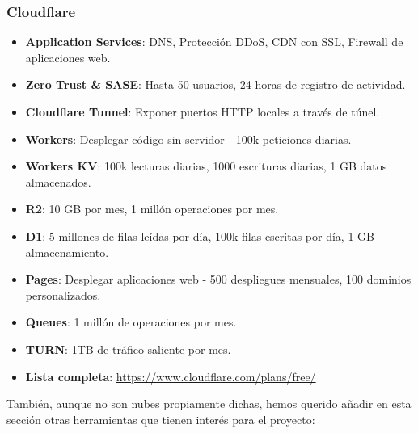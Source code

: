 \subsubsection*{Cloudflare}
\begin{itemize}
	\item \textbf{Application Services}: DNS, Protección DDoS, CDN con SSL, Firewall de aplicaciones web.
	\item \textbf{Zero Trust \& SASE}: Hasta 50 usuarios, 24 horas de registro de actividad.
	\item \textbf{Cloudflare Tunnel}: Exponer puertos HTTP locales a través de túnel.
	\item \textbf{Workers}: Desplegar código sin servidor - 100k peticiones diarias.
	\item \textbf{Workers KV}: 100k lecturas diarias, 1000 escrituras diarias, 1 GB datos almacenados.
	\item \textbf{R2}: 10 GB por mes, 1 millón operaciones por mes.
	\item \textbf{D1}: 5 millones de filas leídas por día, 100k filas escritas por día, 1 GB almacenamiento.
	\item \textbf{Pages}: Desplegar aplicaciones web - 500 despliegues mensuales, 100 dominios personalizados.
	\item \textbf{Queues}: 1 millón de operaciones por mes.
	\item \textbf{TURN}: 1TB de tráfico saliente por mes.
	\item \textbf{Lista completa}: \url{https://www.cloudflare.com/plans/free/}
\end{itemize}

También, aunque no son nubes propiamente dichas, hemos querido añadir en esta sección otras herramientas que tienen interés para el proyecto:


